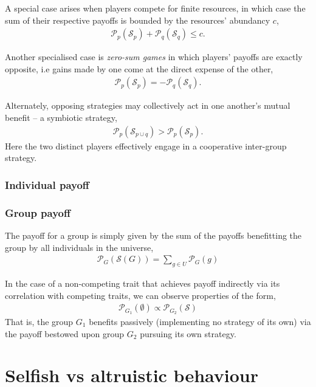 \documentclass[aps,rmp,twocolumn,amsmath,amssymb,nofootinbib,superscriptaddress]{revtex4}
\begin{document}
A special case arises when players compete for finite resources, in which case the sum of their respective payoffs is bounded by the resources' abundancy $c$,
\begin{align}
	\mathcal{P}_p(\mathcal{S}_p) + \mathcal{P}_q(\mathcal{S}_q) \leq c.
\end{align}

Another specialised case is \textit{zero-sum games} in which players' payoffs are exactly opposite, i.e gains made by one come at the direct expense of the other,
\begin{align}
\mathcal{P}_p(\mathcal{S}_p) = -\mathcal{P}_q(\mathcal{S}_q).
\end{align}

Alternately, opposing strategies may collectively act in one another's mutual benefit -- a symbiotic strategy,
\begin{align}
\mathcal{P}_p(\mathcal{S}_{p\cup q}) > \mathcal{P}_p(\mathcal{S}_p).
\end{align}
Here the two distinct players effectively engage in a cooperative inter-group strategy.

\subsubsection{Individual payoff}

\subsubsection{Group payoff}

The payoff for a group is simply given by the sum of the payoffs benefitting the group by all individuals in the universe,
\begin{align}
	\mathcal{P}_{G}(\mathcal{S}(G)) = \sum_{g\in U} \mathcal{P}_G(g)
\end{align}

In the case of a non-competing trait that achieves payoff indirectly via its correlation with competing traits, we can observe properties of the form,
\begin{align}
	\mathcal{P}_{G_1}(\emptyset) \propto \mathcal{P}_{G_2}(\mathcal{S})
\end{align}
That is, the group $G_1$ benefits passively (implementing no strategy of its own) via the payoff bestowed upon group $G_2$ pursuing its own strategy.

\section{Selfish vs altruistic behaviour}
\end{document}

